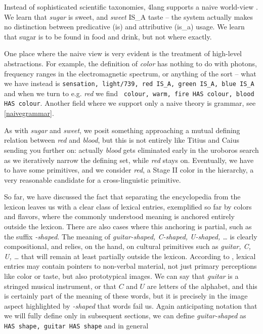 \documentclass[11pt,bookmarks,bookmarksnumbered,naturalnames,plainpages=false,pdftex,colorlinks=true,urlcolor=blue,bookmarksdepth=subsection,plainpages=false]{paper}
\begin{document}
\noindent
Instead of sophisticated scientific taxonomies, 4lang supports a naive
world-view \citep{Hayes:1979,Gordon:2017}. We learn that {\it sugar} is sweet,
and {\it sweet} IS\_A taste -- the system actually makes no distinction
between predicative (is) and attributive (is\_a) usage. We learn that sugar is
to be found in food and drink, but not where exactly.

One place where the naive view is very evident is the treatment of high-level
abstractions. For example, the definition of {\it color} has nothing to do
with photons, frequency ranges in the electromagnetic spectrum, or anything of
the sort -- what we have instead is {\tt sensation, light/739, red IS\_A,
  green IS\_A, blue IS\_A} and when we turn to e.g. {\it red} we find {\tt
  colour, warm, fire HAS colour, blood HAS colour}. Another field where we
support only a naive theory is grammar, see \ref{naivegrammar}.

As with {\it sugar} and {\it sweet}, we posit something approaching a mutual
defining relation between {\it red} and {\it blood}, but this is not entirely
like Titius and Caius sending you further on: actually {\it blood} gets
eliminated early in the uroboros search as we iteratively narrow the defining
set, while {\it red} stays on. Eventually, we have to have some primitives,
and we consider {\it red}, a Stage II color in the \cite{Berlin:1969}
hierarchy, a very reasonable candidate for a cross-linguistic primitive.

So far, we have discussed the fact that separating the encyclopedia from the
lexicon leaves us with a clear class of lexical entries, exemplified so far by
colors and flavors, where the commonly understood meaning is anchored entirely
outside the lexicon.  There are also cases where this anchoring is partial,
such as the suffix {\it -shaped}. The meaning of {\it guitar-shaped, C-shaped,
  U-shaped, \ldots} is clearly compositional, and relies, on the hand, on
cultural primitives such as {\it guitar, C, U, \ldots} that will remain at
least partially outside the lexicon. According to \citet{Rosch:1975}, lexical
entries may contain pointers to non-verbal material, not just primary
perceptions like color or taste, but also prototypical images.  We can say
that {\it guitar} is a stringed musical instrument, or that $C$ and $U$ are
letters of the alphabet, and this is certainly part of the meaning of these
words, but it is precisely in the image aspect highlighted by {\it -shaped}
that words fail us. Again anticipating notation that we will fully define only
in subsequent sections, we can define {\it guitar-shaped} as {\tt HAS shape,
  guitar HAS shape} and in general 
\end{document}
